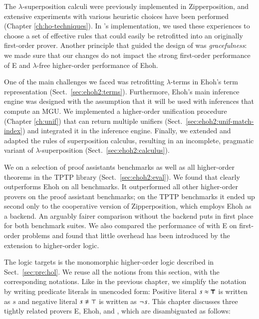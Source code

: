 %
The $\lambda$-superposition calculi were
previously implemented in Zipperposition, and
extensive experiments with various heuristic choices have been performed
(Chapter \ref{ch:ho-techniques}). In \ehohii{}'s implementation, we used
these experiences to choose a set of effective rules that could easily be
retrofitted into an originally first-order prover. Another principle that guided 
the design of \ehohii{} was \emph{gracefulness}: we made sure that our changes
do not impact the strong first-order performance of E and $\lambda$-free higher-order performance of Ehoh. 


One of the main challenges we faced was retrofitting $\lambda$-terms in Ehoh's
term representation (Sect.~\ref{sec:ehoh2:terms}). Furthermore, Ehoh's main inference
engine was designed with the assumption that it will be used with
inferences that compute an MGU. We
implemented a higher-order unification procedure (Chapter \ref{ch:unif})
that can return multiple unifiers (Sect.~\ref{sec:ehoh2:unif-match-index}) and
integrated it in the inference engine. Finally, we extended and adapted the
rules of superposition calculus, resulting in an incomplete, pragmatic variant of
$\lambda$-superposition (Sect.~\ref{sec:ehoh2:calculus}).

We  \ehohii{} on a selection of proof assistants benchmarks
as well as all higher-order theorems in the TPTP library \cite{gs-17-tptp}
(Sect.~\ref{sec:ehoh2:eval}). We found
that \ehohii{} clearly outperforms Ehoh on all benchmarks. It outperformed all other higher-order provers on the
proof assistant benchmarks; on the TPTP benchmarks it ended up second only 
to the cooperative version of Zipperposition, which employs Ehoh as a
backend. An arguably fairer comparison without the backend puts \ehohii{} in
first place for both benchmark suites.
We also compared the performance of \ehohii{} with E on first-order
problems and found that little overhead has been introduced by the
extension to higher-order logic.

 The logic \ehohii{} targets is the monomorphic higher-order
logic described in Sect.~\ref{sec:pre:hol}. We reuse all the notions from this
section, with the corresponding notations. Like in the previous chapter, we
simplify the notation by writing predicate literals in unencoded form: Positive
literal $s \approx \pmb{\top}$ is written as $s$ and negative literal
$\neqlit{s}{\top}$ is written as $\neg{\kern.2ex s}$.   This chapter discusses
three tightly related provers E, Ehoh, and \ehohii{}, which are disambiguated as
follows:

